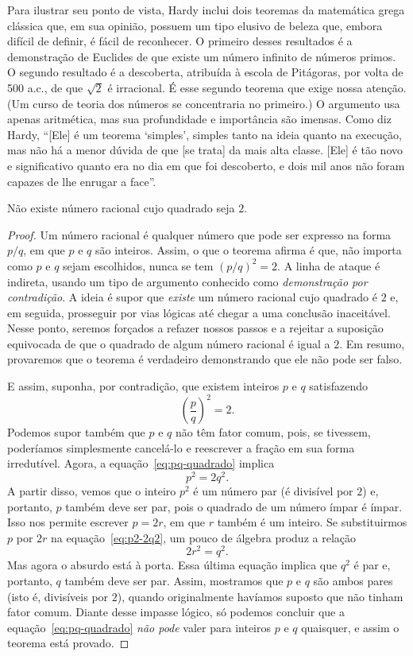 Para ilustrar seu ponto de vista, Hardy inclui dois teoremas da matemática grega clássica que, em sua opinião, possuem um tipo elusivo de beleza que, embora difícil de definir, é fácil de reconhecer. O primeiro desses resultados é a demonstração de Euclides de que existe um número infinito de números primos. O segundo resultado é a descoberta, atribuída à escola de Pitágoras, por volta de 500 a.c., de que $\sqrt{2}$ é irracional. É esse segundo teorema que exige nossa atenção. (Um curso de teoria dos números se concentraria no primeiro.) 
O argumento usa apenas aritmética, mas sua profundidade e importância são imensas.
Como diz Hardy, ``[Ele] é um teorema `simples', simples tanto na ideia quanto na execução, mas não há a menor dúvida de que [se trata] da mais alta classe. [Ele] é tão novo e significativo 
quanto era no dia em que foi descoberto, e dois mil anos não foram capazes de lhe enrugar a face''.

\begin{theorem}\label{thm:irracionalidade-sqrt2}
Não existe número racional cujo quadrado seja $2$.
\end{theorem}

\begin{proof}
Um número racional é qualquer número que pode ser expresso na forma $p/q$, em que $p$ e $q$ são inteiros. Assim, o que o teorema afirma é que, não importa como $p$ e $q$ sejam escolhidos, nunca se tem $(p/q)^{2} = 2$. A linha de ataque é indireta, usando um tipo de argumento conhecido como \textit{demonstração por contradição}. A ideia é supor que \textit{existe} um número racional cujo quadrado é $2$ e, em seguida, prosseguir por vias lógicas até chegar a uma conclusão inaceitável. Nesse ponto, seremos forçados a refazer nossos passos e a rejeitar a suposição equivocada de que o quadrado de algum número racional é igual a $2$. Em resumo, provaremos que o teorema é verdadeiro demonstrando que ele não pode ser falso. 

E assim, suponha, por contradição, que existem inteiros $p$ e $q$ satisfazendo
\[
\left( \frac{p}{q} \right)^{2} = 2. \tag{1}\label{eq:pq-quadrado}
\]
Podemos supor também que $p$ e $q$ não têm fator comum, pois, se tivessem, poderíamos simplesmente cancelá-lo e reescrever a fração em sua forma irredutível. Agora, a equação~\eqref{eq:pq-quadrado} implica
\[
p^{2} = 2 q^{2}. \tag{2}\label{eq:p2-2q2}
\]
A partir disso, vemos que o inteiro $p^{2}$ é um número par (é divisível por $2$) e, portanto, $p$ também deve ser par, pois o quadrado de um número ímpar é ímpar. Isso nos permite escrever $p = 2r$, em que $r$ também é um inteiro. Se substituirmos $p$ por $2r$ na equação~\eqref{eq:p2-2q2}, um pouco de álgebra produz a relação
\[
2 r^{2} = q^{2}.
\]
Mas agora o absurdo está à porta. Essa última equação implica que $q^{2}$ é par e, portanto, $q$ também deve ser par. Assim, mostramos que $p$ e $q$ são ambos pares (isto é, divisíveis por $2$), quando originalmente havíamos suposto que não tinham fator comum. Diante desse impasse lógico, só podemos concluir que a equação~\eqref{eq:pq-quadrado} \textit{não pode} valer para inteiros $p$ e $q$ quaisquer, e assim o teorema está provado.
\end{proof}

